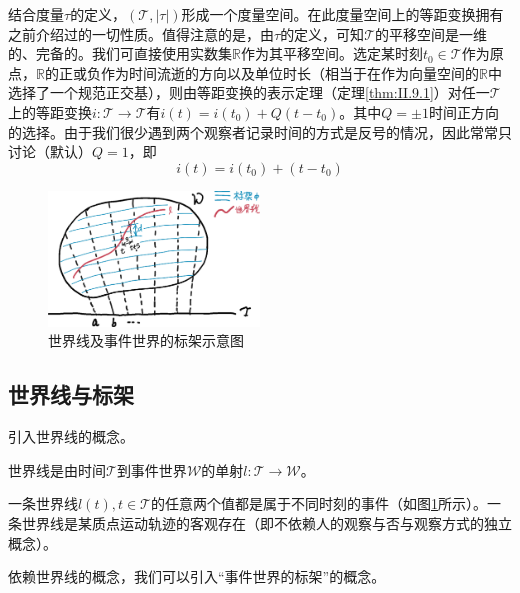 \documentclass[main.tex]{subfiles}
\begin{document}
结合度量$\tau$的定义，$\left(\mathcal{T},\left|\tau\right|\right)$形成一个度量空间。在此度量空间上的等距变换拥有之前介绍过的一切性质。值得注意的是，由$\tau$的定义，可知$\mathcal{T}$的平移空间是一维的、完备的。我们可直接使用实数集$\mathbb{R}$作为其平移空间。选定某时刻$t_0\in\mathcal{T}$作为原点，$\mathbb{R}$的正或负作为时间流逝的方向以及单位时长（相当于在作为向量空间的$\mathbb{R}$中选择了一个规范正交基），则由等距变换的表示定理（定理\ref{thm:II.9.1}）对任一$\mathcal{T}$上的等距变换$i:\mathcal{T}\rightarrow\mathcal{T}$有$i\left(t\right)=i\left(t_0\right)+ Q\left(t-t_0\right)$。其中$Q=\pm 1$时间正方向的选择。由于我们很少遇到两个观察者记录时间的方式是反号的情况，因此常常只讨论（默认）$Q=1$，即
\[
i\left(t\right)=i\left(t_0\right)+\left(t-t_0\right)
\]

\begin{figure}[h]
    \centering
    \includegraphics[width=0.5\textwidth]{images/III.1.3.eps}
    \caption{世界线及事件世界的标架示意图}
    \label{fig:III.1.3}
\end{figure}

\subsection{世界线与标架}
引入世界线的概念。

\begin{definition}[世界线]
世界线是由时间$\mathcal{T}$到事件世界$\mathcal{W}$的单射$l:\mathcal{T}\rightarrow\mathcal{W}$。
\end{definition}

一条世界线$l\left(t\right),t\in\mathcal{T}$的任意两个值都是属于不同时刻的事件（如图\ref{fig:III.1.3}所示）。一条世界线是某质点运动轨迹的客观存在（即不依赖人的观察与否与观察方式的独立概念）。

依赖世界线的概念，我们可以引入“事件世界的标架”的概念。
\end{document}
